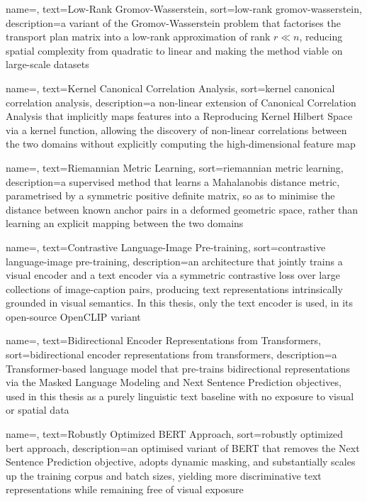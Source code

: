  {
    name=,
    text=Low-Rank Gromov-Wasserstein,
    sort=low-rank gromov-wasserstein,
    description={a variant of the Gromov-Wasserstein problem that factorises the transport plan matrix into a low-rank approximation of rank $r \ll n$, reducing spatial complexity from quadratic to linear and making the method viable on large-scale datasets}
}

 {
    name=,
    text=Kernel Canonical Correlation Analysis,
    sort=kernel canonical correlation analysis,
    description={a non-linear extension of Canonical Correlation Analysis that implicitly maps features into a Reproducing Kernel Hilbert Space via a kernel function, allowing the discovery of non-linear correlations between the two domains without explicitly computing the high-dimensional feature map}
}

 {
    name=,
    text=Riemannian Metric Learning,
    sort=riemannian metric learning,
    description={a supervised method that learns a Mahalanobis distance metric, parametrised by a symmetric positive definite matrix, so as to minimise the distance between known anchor pairs in a deformed geometric space, rather than learning an explicit mapping between the two domains}
}

 {
    name=,
    text=Contrastive Language-Image Pre-training,
    sort=contrastive language-image pre-training,
    description={an architecture that jointly trains a visual encoder and a text encoder via a symmetric contrastive loss over large collections of image-caption pairs, producing text representations intrinsically grounded in visual semantics. In this thesis, only the text encoder is used, in its open-source OpenCLIP variant}
}

 {
    name=,
    text=Bidirectional Encoder Representations from Transformers,
    sort=bidirectional encoder representations from transformers,
    description={a Transformer-based language model that pre-trains bidirectional representations via the Masked Language Modeling and Next Sentence Prediction objectives, used in this thesis as a purely linguistic text baseline with no exposure to visual or spatial data}
}

 {
    name=,
    text=Robustly Optimized BERT Approach,
    sort=robustly optimized bert approach,
    description={an optimised variant of BERT that removes the Next Sentence Prediction objective, adopts dynamic masking, and substantially scales up the training corpus and batch sizes, yielding more discriminative text representations while remaining free of visual exposure}
}

